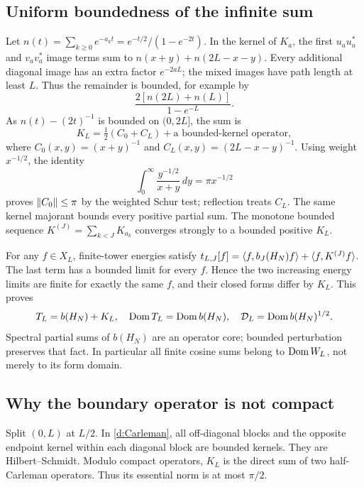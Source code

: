 \subsection{Uniform boundedness of the infinite sum}
Let $n(t)=\sum_{k\ge0}e^{-a_kt}=e^{-t/2}/(1-e^{-2t})$. In the kernel
of $K_a$, the first $u_au_a^*$ and $v_av_a^*$ image terms sum to
$n(x+y)+n(2L-x-y)$. Every additional diagonal image has an extra
factor $e^{-2aL}$; the mixed images have path length at least $L$.
Thus the remainder is bounded, for example by
\[
\frac{2[n(2L)+n(L)]}{1-e^{-L}}.
\]
As $n(t)-(2t)^{-1}$ is bounded on $(0,2L]$, the sum is
\begin{equation}\label{d:Carleman}
K_L=\tfrac12(C_0+C_L)+\text{a bounded-kernel operator},
\end{equation}
where $C_0(x,y)=(x+y)^{-1}$ and $C_L(x,y)=(2L-x-y)^{-1}$.
Using weight $x^{-1/2}$, the identity
\[
\int_0^\infty\frac{y^{-1/2}}{x+y}\,dy=\pi x^{-1/2}
\]
proves $\lVert C_0\rVert\le\pi$ by the weighted Schur test; reflection treats
$C_L$. The same kernel majorant bounds every positive partial sum.
The monotone bounded sequence $K^{(J)}=\sum_{k<J}K_{a_k}$ converges strongly
to a bounded positive $K_L$.

For any $f\in X_L$, finite-tower energies satisfy
$t_{L,J}[f]=\langle f,b_J(H_N)f\rangle+\langle f,K^{(J)}f\rangle$.
The last term has a bounded limit for every $f$. Hence the two increasing
energy limits are finite for exactly the same $f$, and their closed forms
differ by $K_L$. This proves
\begin{equation}\label{d:domains}
T_L=b(H_N)+K_L,\quad\operatorname{Dom} T_L=\operatorname{Dom} b(H_N),\quad
\mathcal D_L=\operatorname{Dom} b(H_N)^{1/2}.
\end{equation}
Spectral partial sums of $b(H_N)$ are an operator core; bounded perturbation
preserves that fact. In particular all finite cosine sums belong to
$\operatorname{Dom} W_L$, not merely to its form domain.

\subsection{Why the boundary operator is not compact}
Split $(0,L)$ at $L/2$. In \eqref{d:Carleman}, all off-diagonal blocks and
the opposite endpoint kernel within each diagonal block are bounded kernels.
They are Hilbert--Schmidt. Modulo compact operators, $K_L$ is the direct
sum of two half-Carleman operators. Thus its essential norm is at most
$\pi/2$.

